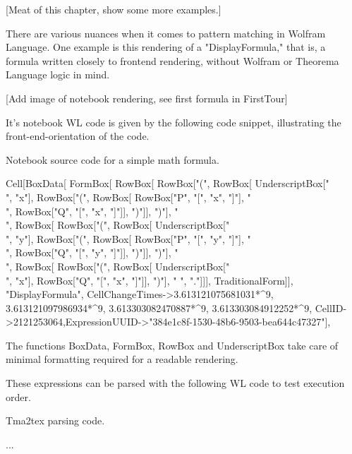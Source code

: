 [Meat of this chapter, show some more examples.]

There are various nuances when it comes to pattern matching in Wolfram Language. One example is this rendering of a "DisplayFormula," that is, a formula written closely to frontend rendering, without Wolfram or Theorema Language logic in mind.

[Add image of notebook rendering, see first formula in FirstTour]

It's notebook WL code is given by the following code snippet, illustrating the front-end-orientation of the code.

\begin{program}
\caption{Notebook source code for a simple math formula.}
\label{prog:AlgExample}
\begin{LaTeXCode}
Cell[BoxData[
 FormBox[
  RowBox[{
   RowBox[{"(", 
    RowBox[{
     UnderscriptBox["\\[ForAll]", "x"], 
     RowBox[{"(", 
      RowBox[{
       RowBox[{"P", "[", "x", "]"}], "\\[Or]", 
       RowBox[{"Q", "[", "x", "]"}]}], ")"}]}], ")"}], "\\[And]", 
   RowBox[{
    RowBox[{"(", 
     RowBox[{
      UnderscriptBox["\\[ForAll]", "y"], 
      RowBox[{"(", 
       RowBox[{
        RowBox[{"P", "[", "y", "]"}], "\\[Implies]", 
        RowBox[{"Q", "[", "y", "]"}]}], ")"}]}], ")"}], 
    "\\[DoubleLeftRightArrow]", 
    RowBox[{
     RowBox[{"(", 
      RowBox[{
       UnderscriptBox["\\[ForAll]", "x"], 
       RowBox[{"Q", "[", "x", "]"}]}], ")"}], " ", "."}]}]}], 
  TraditionalForm]], "DisplayFormula",
 CellChangeTimes->{{3.613121075681031*^9, 3.613121097986934*^9}, {
  3.613303082470887*^9, 3.613303084912252*^9}},
 CellID->2121253064,ExpressionUUID->"384e1c8f-1530-48b6-9503-bea644c47327"],
\end{LaTeXCode}
\end{program}

The functions BoxData, FormBox, RowBox and UnderscriptBox take care of minimal formatting required for a readable rendering. 

These expressions can be parsed with the following WL code to test execution order.

\begin{program}
\caption{Tma2tex parsing code.}
\label{prog:AlgExample}
\begin{LaTeXCode}
...
\end{LaTeXCode}
\end{program}

